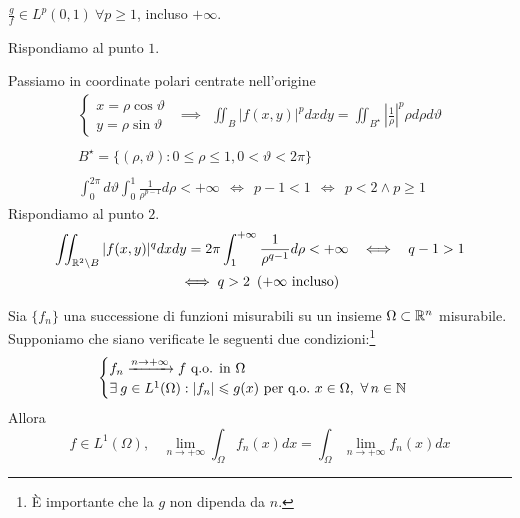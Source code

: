 $\frac{g}{f} \in L^{p}( 0,1) \ \forall p\geqslant 1$, incluso $+\infty $.
\Soluzione

Rispondiamo al punto $1$.

Passiamo in coordinate polari centrate nell'origine
\begin{gather*}
\begin{cases}
x=\rho \cos \vartheta \\
y=\rho \sin \vartheta 
\end{cases} \ \ \implies \ \ \iint _{B}| f( x,y)| ^{p} dxdy=\iint _{B^{\star }}\left| \frac{1}{\rho }\right| ^{p} \rho d\rho d\vartheta \\
\\
B^{\star } =\{( \rho ,\vartheta ) :0\leqslant \rho \leqslant 1,0< \vartheta < 2\pi \}\\
\\
\int ^{2\pi }_{0} d\vartheta \int ^{1}_{0}\frac{1}{\rho ^{p-1}} d\rho < +\infty \ \ \iff \ \ p-1< 1\ \ \iff \ \ p< 2\land p\geqslant 1
\end{gather*}
Rispondiamo al punto $2$.
\begin{gather*}
\iint _{\mathbb{R} ^{2} \setminus B}| f( x,y)| ^{q} dxdy=2\pi \int ^{+\infty }_{1}\frac{1}{\rho ^{q-1}} d\rho < +\infty \ \ \iff \ \ q-1 >1\\
\iff q >2\ \left( +\infty \ \text{incluso}\right)
\end{gather*}
\Soluzione
\begin{thm}
 Sia $\{f_{n}\}$ una successione di funzioni misurabili su un insieme $\Omega \subset \mathbb{R} ^{n}$ misurabile. Supponiamo che siano verificate le seguenti due condizioni:\footnote{È importante che la $g$ non dipenda da $n$.}
\begin{equation*}
\begin{cases}
f_{n}\xrightarrow{n\rightarrow +\infty } f\ \text{q.o. in} \ \Omega \\
\exists g\in L^{1}( \Omega ) :| f_{n}| \leqslant g( x) \ \text{per q.o.} \ x\in \Omega ,\ \forall n\in \NN 
\end{cases}
\end{equation*}
Allora
\begin{equation*}
f\in L^{1}( \Omega ) ,\ \ \ \ \lim _{n\rightarrow +\infty }\int _{\Omega } f_{n}( x) dx=\int _{\Omega }\lim _{n\rightarrow +\infty } f_{n}( x) dx
\end{equation*}
\end{thm}
